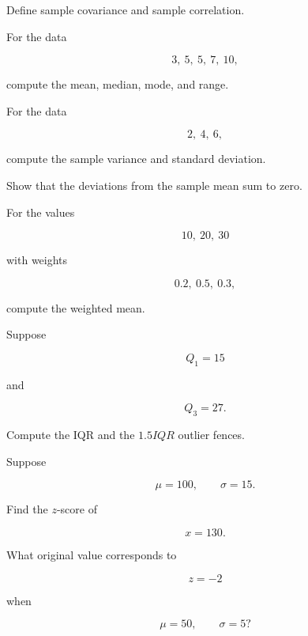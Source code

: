 \begin{exercise}[1]
Define sample covariance and sample correlation.
\end{exercise}

\begin{exercise}[2]
For the data

\[
3,\ 5,\ 5,\ 7,\ 10,
\]

compute the mean, median, mode, and range.
\end{exercise}

\begin{exercise}[2]
For the data

\[
2,\ 4,\ 6,
\]

compute the sample variance and standard deviation.
\end{exercise}

\begin{exercise}[2]
Show that the deviations from the sample mean sum to zero.
\end{exercise}

\begin{exercise}[2]
For the values

\[
10,\ 20,\ 30
\]

with weights

\[
0.2,\ 0.5,\ 0.3,
\]

compute the weighted mean.
\end{exercise}

\begin{exercise}[2]
Suppose

\[
Q_1=15
\]

and

\[
Q_3=27.
\]

Compute the IQR and the \(1.5IQR\) outlier fences.
\end{exercise}

\begin{exercise}[2]
Suppose

\[
\mu=100,
\qquad
\sigma=15.
\]

Find the \(z\)-score of

\[
x=130.
\]
\end{exercise}

\begin{exercise}[2]
What original value corresponds to

\[
z=-2
\]

when

\[
\mu=50,
\qquad
\sigma=5?
\]
\end{exercise}

